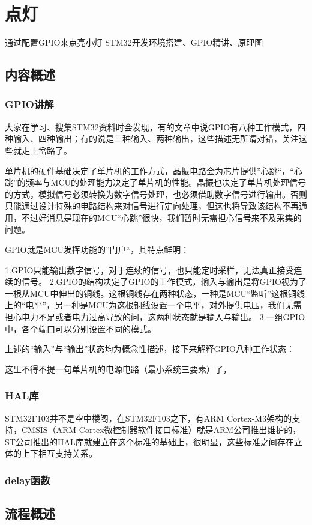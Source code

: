 \documentclass[UTF8]{ctexart}
\begin{document}
\newpage
\section{点灯}
通过配置GPIO来点亮小灯
STM32开发环境搭建、GPIO精讲、原理图
\subsection{内容概述}
\subsubsection{GPIO讲解}
大家在学习、搜集STM32资料时会发现，有的文章中说GPIO有八种工作模式，四种输入、四种输出；有的说是三种输入、两种输出，这些描述无所谓对错，关注这些就走上岔路了。

单片机的硬件基础决定了单片机的工作方式，晶振电路会为芯片提供”心跳“，“心跳”的频率与MCU的处理能力决定了单片机的性能。晶振也决定了单片机处理信号的方式，模拟信号必须转换为数字信号处理，也必须借助数字信号进行输出。否则只能通过设计特殊的电路结构来对信号进行定向处理，但这也将导致该结构不再通用，不过好消息是现在的MCU“心跳”很快，我们暂时无需担心信号来不及采集的问题。

GPIO就是MCU发挥功能的”门户“，其特点鲜明：

1.GPIO只能输出数字信号，对于连续的信号，也只能定时采样，无法真正接受连续的信号。
2.GPIO的结构决定了GPIO的工作模式，输入与输出是将GPIO视为了一根从MCU中伸出的铜线。这根铜线存在两种状态，一种是MCU“监听”这根铜线上的“电平”，另一种是MCU为这根铜线设置一个电平，对外提供电压，我们无需担心电力不足或者电力过高导致的问，这两种状态就是输入与输出。
3.一组GPIO中，各个端口可以分别设置不同的模式。

上述的“输入”与“输出”状态均为概念性描述，接下来解释GPIO八种工作状态：

这里不得不提一句单片机的电源电路（最小系统三要素）了，



\subsubsection{HAL库}
STM32F103并不是空中楼阁，在STM32F103之下，有ARM Cortex-M3架构的支持，CMSIS（ARM Cortex微控制器软件接口标准）就是ARM公司推出维护的，ST公司推出的HAL库就建立在这个标准的基础上，很明显，这些标准之间存在立体的上下相互支持关系。
\subsubsection{delay函数}

\subsection{流程概述}
\end{document}
